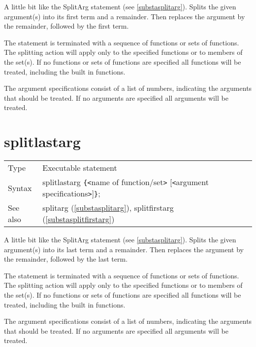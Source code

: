 \noindent A little bit like the 
SplitArg statement (see \ref{substasplitarg}). Splits the 
given argument(s) into its first term and a remainder. Then replaces the 
argument by the remainder, followed by the first term.

\noindent The statement is terminated with a sequence of functions or sets 
of functions. The splitting action will apply only to the specified 
functions or to members of the set(s). If no functions or sets 
of functions are specified all functions will be treated, including the 
built in functions.
 
\noindent The argument specifications consist of a list of numbers, 
indicating the arguments that should be treated. If no arguments are 
specified all arguments will be treated. \vspace{10mm}


\section{splitlastarg}
\label{substasplitlastarg}

\noindent \begin{tabular}{ll}
Type & Executable statement\\
Syntax & splitlastarg \verb:{:{\tt<}name of function/set{\tt>}
         [{\tt<}argument specifications{\tt>}]\verb:}:;
\\ See also & splitarg (\ref{substasplitarg}),
             splitfirstarg (\ref{substasplitfirstarg})
\end{tabular}\vspace{4mm}

\noindent A little bit like the 
SplitArg statement (see \ref{substasplitarg}). Splits the 
given argument(s) into its last term and a remainder. Then replaces the 
argument by the remainder, followed by the last term.

\noindent The statement is terminated with a sequence of functions or sets 
of functions. The splitting action will apply only to the specified 
functions or to members of the set(s). If no functions or sets 
of functions are specified all functions will be treated, including the 
built in functions.
 
\noindent The argument specifications consist of a list of numbers, 
indicating the arguments that should be treated. If no arguments are 
specified all arguments will be treated. \vspace{10mm}

